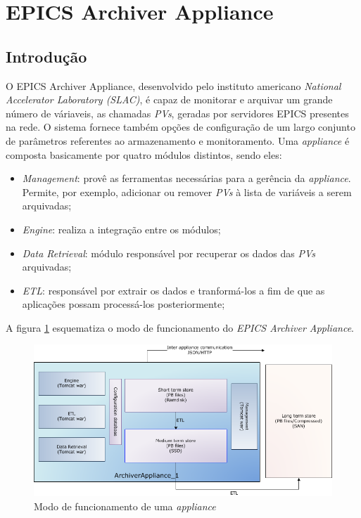 \section {EPICS Archiver Appliance}
\label{sec:archiver}
\subsection {Introdução}

O EPICS Archiver Appliance, desenvolvido pelo instituto americano
\textit{National Accelerator Laboratory (SLAC)}, é capaz de monitorar e arquivar
um grande número de váriaveis, as chamadas \textit{PVs}, geradas por servidores
EPICS presentes na rede. O sistema fornece também opções de configuração de um
largo conjunto de parâmetros referentes ao armazenamento e monitoramento. Uma
\textit{appliance} é composta basicamente por quatro módulos distintos, sendo eles:

\begin{itemize}
  \renewcommand\labelitemi{--}
  \item \textit{Management}: provê as ferramentas necessárias para a gerência
  da \textit{appliance}. Permite, por exemplo, adicionar ou remover \textit{PVs}
  à lista de variáveis a serem arquivadas;
  \item \textit{Engine}: realiza a integração entre os módulos;
  \item \textit{Data Retrieval}: módulo responsável por recuperar os dados das
  \textit{PVs} arquivadas;
  \item \textit{ETL}: responsável por extrair os dados e tranformá-los a fim de
  que as aplicações possam processá-los posteriormente;
\end{itemize}

A figura \ref{fig:epics_archiver} esquematiza o modo de funcionamento do
\textit{EPICS Archiver Appliance}.

\FloatBarrier

\begin{figure}[h]
    
    \centering
    \includegraphics[scale=0.6]{image/applarch}
    \caption {Modo de funcionamento de uma \textit{appliance}}
    \label{fig:epics_archiver} 
\end{figure} 

